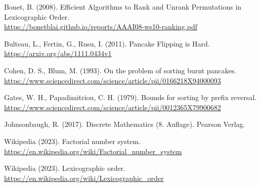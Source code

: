 \documentclass[a4paper, 10pt, ngerman]{article}
\begin{document}
\begin{thebibliography}{7}
    Bonet, B. (2008).
    Efficient Algorithms to Rank and Unrank Permutations in Lexicographic Order. \\
    \href{https://bonetblai.github.io/reports/AAAI08-ws10-ranking.pdf}{https://bonetblai.github.io/reports/AAAI08-ws10-ranking.pdf}

    Bulteau, L., Fertin, G., Rusu, I. (2011).
    Pancake Flipping is Hard. \\
    \href{https://arxiv.org/abs/1111.0434v1}{https://arxiv.org/abs/1111.0434v1}

    Cohen, D. S., Blum, M. (1993).
    On the problem of sorting burnt pancakes. \\
    \href{https://www.sciencedirect.com/science/article/pii/0166218X94000093}{https://www.sciencedirect.com/science/article/pii/0166218X94000093}

    Gates, W. H., Papadimitriou, C. H. (1979). 
    Bounds for sorting by prefix reversal. \\
    \href{https://www.sciencedirect.com/science/article/pii/0012365X79900682}{https://www.sciencedirect.com/science/article/pii/0012365X79900682}

    Johnsonbaugh, R. (2017).
    Discrete Mathematics (8. Auflage).
    Pearson Verlag.

    Wikipedia (2023).
    Factorial number system. \\
    \href{https://en.wikipedia.org/wiki/Factorial\_number\_system}{https://en.wikipedia.org/wiki/Factorial\_number\_system}

    Wikipedia (2023).
    Lexicographic order. \\
    \href{https://en.wikipedia.org/wiki/Lexicographic\_order}{https://en.wikipedia.org/wiki/Lexicographic\_order}
\end{thebibliography}
\end{document}

